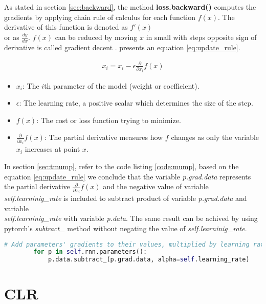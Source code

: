 As stated in section \ref{sec:backward}, the method \textbf{loss.backward()} computes the gradients by applying chain rule of calculus for each function $f(x)$. The derivative of this function is denoted as $f'(x)$ \\ or as $\frac{dy}{dx}$. $f(x)$ can be reduced by moving $x$ in small with steps opposite sign of derivative is called gradient decent \parencite{cauchy}.  \parencite[section 4.3]{Goodfellow-et-al-2016} presents an equation \ref{eq:update_rule}.

\begin{align}
    x_i = x_i - \epsilon \frac{\partial}{\partial x_i} f(x) \label{eq:update_rule}
\end{align}

\begin{itemize}
    \item \( x_i \): The \(i\)th parameter of the model (weight or coefficient).
    \item \( \epsilon \): The learning rate, a positive scalar which determines the size of the step.
    \item \( f(x) \): The cost or loss function trying to minimize.
    \item \( \frac{\partial}{\partial x_i} f(x)\): The partial derivative  measures how \( f \) changes as only the variable \( x_i \) increases at point  \( x \).
\end{itemize}


In section \ref{sec:tmump}, refer to the code listing \ref{code:mump}, based on the equation \ref{eq:update_rule} we conclude that the variable \textit{p.grad.data} represents the partial derivative \( \frac{\partial}{\partial x_i} f(x) \) and the negative value of variable \textit{self.learninig\_rate} is included to subtract product of  variable \textit{p.grad.data} and variable \\ \textit{self.learninig\_rate} with variable \textit{p.data}. The same result can be achived by using pytorch's  \textit{subtract\_} method without negating the value of \textit{self.learninig\_rate}.

\begin{lstlisting}[language=Python,caption={Manual gradient updation with substract\_}, label={code:mumps}]
    # Add parameters' gradients to their values, multiplied by learning rate
        for p in self.rnn.parameters():
            p.data.subtract_(p.grad.data, alpha=self.learning_rate)
\end{lstlisting}

\section{\acf{CLR}}

